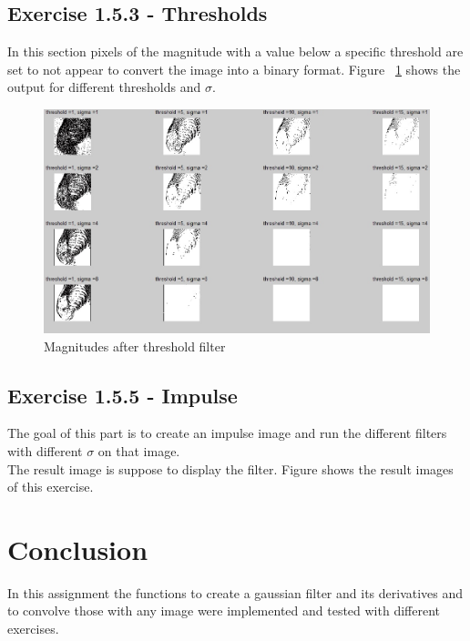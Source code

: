 \documentclass[11pt]{article}
\begin{document}
\subsection{Exercise 1.5.3 - Thresholds}
In this section pixels of the magnitude with a value below a specific threshold are set to not appear to convert the image into a binary format. Figure ~\ref{threshold} shows the output for different thresholds and $\sigma$.

\begin{figure}[h!]
\includegraphics[scale=0.6]{thresholds.jpg}
\caption{Magnitudes after threshold filter}
\label{threshold}
\end{figure}

\subsection{Exercise 1.5.5 - Impulse}
The goal of this part is to create an impulse image and run the different filters with different $\sigma$ on that image.\\
The result image is suppose to display the filter. Figure shows the result images of this exercise.

\section{Conclusion}
In this assignment the functions to create a gaussian filter and its derivatives and to convolve those with any image were implemented and tested with different exercises. 
\end{document}
